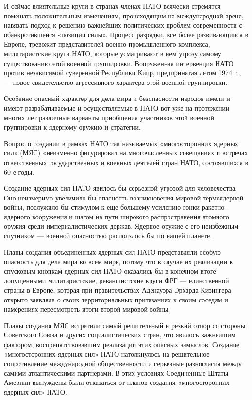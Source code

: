 \documentclass[12pt, a4paper, openany]{book}
\begin{document}
И сейчас влиятельные круги в странах-членах НАТО всячески стремятся помешать положительным изменениям, происходящим на международной арене, навязать подход к решению важнейших политических проблем современности с обанкротившейся «позиции силы». Процесс разрядки, все более развивающийся в Европе, тревожит представителей военно-промышленного комплекса, милитаристские круги НАТО, которые усматривают в нем угрозу самому существованию этой военной группировки. Вооруженная интервенция НАТО против независимой суверенной Республики Кипр, предпринятая летом 1974 г., — новое свидетельство агрессивного характера этой военной группировки.

Особенно опасный характер для дела мира и безопасности народов имели и имеют разрабатываемые и осуществляемые в НАТО вот уже на протяжении многих лет различные варианты приобщения участников этой военной группировки к ядерному оружию и стратегии.

Вопрос о создании в рамках НАТО так называемых «многосторонних ядерных сил» (МЯС) «неизменно фигурировал на многочисленных совещаниях и встречах ответственных государственных и военных деятелей стран НАТО, состоявшихся в 60-е годы.

Создание ядерных сил НАТО явилось бы серьезной угрозой для человечества. Оно неизмеримо увеличило бы опасность возникновения мировой термоядерной войны, послужило бы стимулом к еще большему усилению гонки ракетно-ядерного вооружения и шагом на пути широкого распространения атомного оружия среди империалистических держав. Ядерное оружие с его неизбежным спутником — военной опасностью расползлось бы по нашей планете.

Планы создания объединенных ядерных сил НАТО представляли особую опасность для дела мира во всем мире, потому что в случае их реализации к спусковым кнопкам ядерных сил НАТО оказались бы в конечном итоге допущенными милитаристские, реваншистские круги ФРГ — единственной страны в Европе, которая при правительствах Аденауэра-Эрхарда-Кизингера открыто заявляла о своих территориальных притязаниях к своим соседям и намерениях пересмотреть итоги второй мировой войны.

Планы создания МЯС встретили самый решительный и резкий отпор со стороны Советского Союза и других социалистических стран, что явилось важнейшим фактором, воспрепятствовавшим реализации этих опасных замыслов. Создание «многосторонних ядерных сил» НАТО натолкнулось на решительное сопротивление международной общественности и серьезные разногласия между самими атлантическими партнерами. В этих условиях Соединенные Штаты Америки вынуждены были отказаться от планов создания «многосторонних ядерных сил» НАТО.
\end{document}
